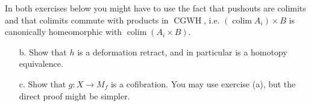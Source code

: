 \documentclass{article}
\numberwithin{equation}{section}
\DeclareMathOperator{\CGWH}{CGWH}
\DeclareMathOperator{\colim}{colim}
\begin{document}
\begin{remark}
		In both exercises below you might have to use the fact that pushouts are colimits and that colimits commute with products in $\CGWH$, i.e. $(\colim A_i)\times B$ is canonically homeomorphic with $\colim(A_i \times B)$.
\end{remark}
\begin{exercise}\leavevmode
	\begin{enumerate}
		\item[b.] Show that $h$ is a deformation retract, and in particular is a homotopy equivalence.\label{exer:1.2.a}
		\item[c.] Show that $g : X \to M_f$ is a cofibration. You may use exercise (a), but the direct proof might be simpler.
	\end{enumerate}
\end{exercise}
\end{document}
